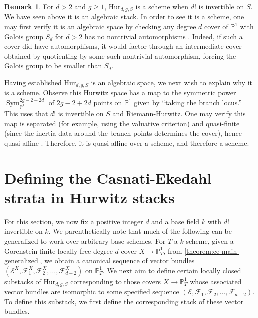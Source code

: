 \documentclass[12 pt]{amsart}
\theoremstyle{plain}
\theoremstyle{definition}
\newtheorem{remark}[theorem]{Remark}
\theoremstyle{remark}
\numberwithin{equation}{section}
\newcommand\bp{\mathbb P}
\newcommand\sce{\mathscr E}
\newcommand\scf{\mathscr F}
\newcommand \ra{\rightarrow}
\newcommand\bighurg[3]{\overline{\mathrm{Hur}}_{#1,#2, #3}} %
\newcommand\hur[3]{\mathrm{Hur}_{#1,#2,#3}} %
\DeclareMathOperator\sym{Sym}
\begin{document}
\begin{remark}
	\label{remark:}
	For $d > 2$ and $g \geq 1$, $\hur d g S$
	is a scheme when $d!$ is invertible on $S$.
	We have seen above it is an algebraic stack.
	In order to see it is a scheme, one may first verify it is an algebraic
	space by checking any degree $d$ cover of $\bp^1$ with Galois group
	$S_d$ for $d > 2$ has no
	nontrivial
	automorphisms \cite[\href{https://stacks.math.columbia.edu/tag/04SZ}{Tag 04SZ}]{stacks-project}.
	Indeed, if such a cover did have automorphisms, it would factor through
	an intermediate cover obtained by quotienting by some such nontrivial
	automorphism, forcing the Galois group to be smaller than $S_d$.

	Having established $\hur d g S$ is an algebraic space, we next wish to
	explain why it is a scheme.
	Observe this Hurwitz space has a map to the symmetric power
	$\sym^{2g-2+2d}_{\bp^1}$ of $2g-2 + 2d$ points on $\bp^1$ given by
	``taking the branch locus.'' This uses that
	$d!$ is invertible on $S$ and Riemann-Hurwitz.
	One may verify this map is separated (for example, using the valuative
	criterion) and quasi-finite (since the inertia data around the branch
	points determines the cover), hence quasi-affine
\cite[\href{https://stacks.math.columbia.edu/tag/082J}{Tag
082J}]{stacks-project}.
Therefore, it is quasi-affine over a scheme, and therefore a scheme.
\end{remark}



\section{Defining the Casnati-Ekedahl strata in Hurwitz stacks} \label{section:ce-loci}

For this section, we now fix a positive integer $d$ and a base field $k$ with $d!$
invertible on $k$. We parenthetically note that much of the following can be
generalized to work
over arbitrary base schemes.
For $T$ a $k$-scheme,
given a Gorenstein finite locally free degree $d$ cover $X \ra \bp^1_T$, from
\autoref{theorem:ce-main-generalized}, we obtain a canonical sequence of vector
bundles $(\sce^X, \scf_1^X, \scf_2^X, \ldots, \scf_{d-2}^X)$ on $\bp^1_T$.
We next aim to define certain locally closed substacks of $\bighurg d g S$
corresponding to those covers $X \to \bp^1_T$ whose associated vector bundles are isomorphic
to some specified sequence $(\sce, \scf_1, \scf_2, \ldots, \scf_{d-2})$.
To define this substack, we first define the corresponding stack of these vector
bundles.
\end{document}
